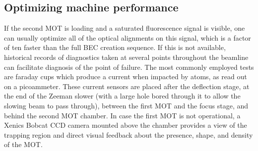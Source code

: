 \subsection*{Optimizing machine performance}


	If the second MOT is loading and a saturated fluorescence signal is visible, one can usually optimize all of the optical alignments on this signal, which is a factor of ten faster than the full BEC creation sequence. If this is not available, historical records of diagnostics taken at several points throughout the beamline can facilitate diagnosis of the point of failure. The most commonly employed tests are faraday cups which produce a current when impacted by \mhe atoms, as read out on a picoammeter. These current sensors are placed after the deflection stage, at the end of the Zeeman slower (with a large hole bored through it to allow the slowing beam to pass through), between the first MOT and the focus stage, and behind the second MOT chamber. In case the first MOT is not operational, a Xenics Bobcat CCD camera mounted above the chamber provides a view of the trapping region and direct visual feedback about the presence, shape, and density of the MOT. 




